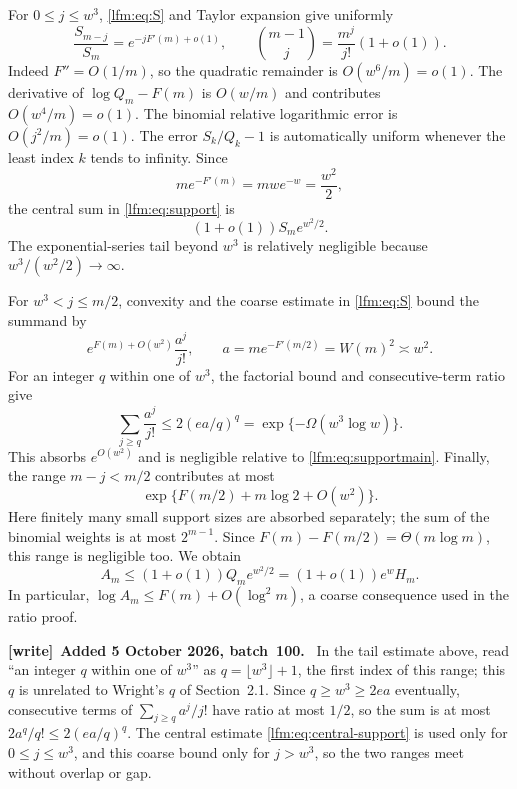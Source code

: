 \documentclass[11pt,letterpaper]{article}
\theoremstyle{remark}\newtheorem{remark}[theorem]{Remark}
\newenvironment{writenote}[1][]{\par\smallskip\begingroup\small
 \noindent\textbf{[write]}\if\relax\detokenize{#1}\relax\else~\textbf{#1.}\fi\ }%
 {\par\endgroup\smallskip}
\begin{document}
For $0\le j\le w^3$, \eqref{lfm:eq:S} and Taylor expansion give uniformly
\begin{equation}
 \frac{S_{m-j}}{S_m}=e^{-jF'(m)+o(1)},\qquad
 \binom{m-1}{j}=\frac{m^j}{j!}(1+o(1)).\label{lfm:eq:central-support}
\end{equation}
Indeed $F''=O(1/m)$, so the quadratic remainder is $O(w^6/m)=o(1)$. The derivative of $\log Q_m-F(m)$ is $O(w/m)$ and contributes $O(w^4/m)=o(1)$. The binomial relative logarithmic error is $O(j^2/m)=o(1)$. The error $S_k/Q_k-1$ is automatically uniform whenever the least index $k$ tends to infinity. Since
\[
 m e^{-F'(m)}=mwe^{-w}=\frac{w^2}{2},
\]
the central sum in \eqref{lfm:eq:support} is
\begin{equation}
 (1+o(1))S_m e^{w^2/2}.\label{lfm:eq:supportmain}
\end{equation}
The exponential-series tail beyond $w^3$ is relatively negligible because $w^3/(w^2/2)\to\infty$.

For $w^3<j\le m/2$, convexity and the coarse estimate in \eqref{lfm:eq:S} bound the summand by
\[
 e^{F(m)+O(w^2)}\frac{a^j}{j!},\qquad
 a=m e^{-F'(m/2)}=W(m)^2\asymp w^2.
\]
For an integer $q$ within one of $w^3$, the factorial bound and consecutive-term ratio give
\[
 \sum_{j\ge q}\frac{a^j}{j!}\le2(ea/q)^q
 =\exp\{-\Omega(w^3\log w)\}.
\]
This absorbs $e^{O(w^2)}$ and is negligible relative to \eqref{lfm:eq:supportmain}. Finally, the range $m-j<m/2$ contributes at most
\[
 \exp\{F(m/2)+m\log2+O(w^2)\}.
\]
Here finitely many small support sizes are absorbed separately; the sum of the binomial weights is at most $2^{m-1}$. Since $F(m)-F(m/2)=\Theta(m\log m)$, this range is negligible too. We obtain
\begin{equation}
 A_m\le(1+o(1))Q_m e^{w^2/2}
 =(1+o(1))e^wH_m.\label{lfm:eq:upperH}
\end{equation}
In particular, $\log A_m\le F(m)+O(\log^2m)$, a coarse consequence used in the ratio proof.

\begin{writenote}[Added 5 October 2026, batch~100]
In the tail estimate above, read ``an integer $q$ within one of $w^3$'' as $q=\lfloor w^3\rfloor+1$, the
first index of this range; this $q$ is unrelated to Wright's $q$ of
Section~2.1. Since $q\ge w^3\ge2ea$ eventually, consecutive terms of
$\sum_{j\ge q}a^j/j!$ have ratio at most $1/2$, so the sum is at most
$2a^q/q!\le2(ea/q)^q$. The central estimate \eqref{lfm:eq:central-support} is
used only for $0\le j\le w^3$, and this coarse bound only for $j>w^3$, so the
two ranges meet without overlap or gap.
\end{writenote}
\end{document}
